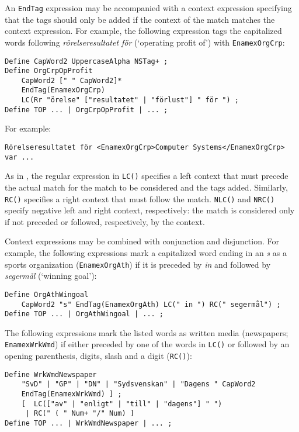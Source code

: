 \documentclass{llncs}
\begin{document}
An \texttt{EndTag} expression may be accompanied with a context
expression specifying that the tags should only be added if the
context of the match matches the context expression. For example, the
following expression tags the capitalized words following
\textit{rörelseresultatet för} (`operating profit of') with
\texttt{EnamexOrgCrp}:

\begin{verbatim}
Define CapWord2 UppercaseAlpha NSTag+ ;
Define OrgCrpOpProfit
    CapWord2 [" " CapWord2]*
    EndTag(EnamexOrgCrp)
    LC(Rr "örelse" ["resultatet" | "förlust"] " för ") ;
Define TOP ... | OrgCrpOpProfit | ... ;
\end{verbatim}

\noindent
For example:
\begin{verbatim}
Rörelseresultatet för <EnamexOrgCrp>Computer Systems</EnamexOrgCrp>
var ...
\end{verbatim}

As in \cite{karttunen/2011}, the regular expression in \texttt{LC()}
specifies a left context that must precede the actual match for the
match to be considered and the tags added. Similarly, \texttt{RC()}
specifies a right context that must follow the match. \texttt{NLC()}
and \texttt{NRC()} specify negative left and right context,
respectively: the match is considered only if not preceded or
followed, respectively, by the context.

Context expressions may be combined with conjunction and disjunction.
For example, the following expressions mark a capitalized word ending
in an \textit{s} as a sports organization (\texttt{EnamexOrgAth}) if
it is preceded by \textit{in} and followed by \textit{segermål}
(`winning goal'):

\begin{verbatim}
Define OrgAthWingoal
    CapWord2 "s" EndTag(EnamexOrgAth) LC(" in ") RC(" segermål") ;
Define TOP ... | OrgAthWingoal | ... ;
\end{verbatim}

\noindent
The following expressions mark the listed words as written media
(newspapers; \texttt{EnamexWrkWmd}) if either preceded by one of the
words in \texttt{LC()} or followed by an opening parenthesis, digits,
slash and a digit (\texttt{RC()}):

\begin{verbatim}
Define WrkWmdNewspaper
    "SvD" | "GP" | "DN" | "Sydsvenskan" | "Dagens " CapWord2
    EndTag(EnamexWrkWmd) ] ;
    [  LC(["av" | "enligt" | "till" | "dagens"] " ")
     | RC(" ( " Num+ "/" Num) ]
Define TOP ... | WrkWmdNewspaper | ... ;
\end{verbatim}
\end{document}
